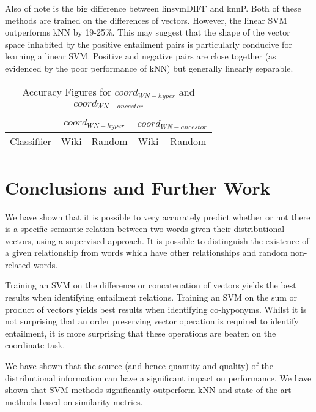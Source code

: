 \documentclass[11pt]{article}
\begin{document}
Also of note is the big difference between linsvmDIFF and knnP.  Both of these methods are trained on the differences of vectors.  However, the linear SVM outperforms kNN by 19-25\%.  This may suggest that the shape of the vector space inhabited by the positive entailment pairs is particularly conducive for learning a linear SVM.  Positive and negative pairs are close together (as evidenced by the poor performance of kNN) but generally linearly separable.

\begin{table*}[ht]
\centering
\begin{tabular}{|c|c|c|c|c|}
\hline
&\multicolumn{2}{|c|}{$coord_{WN-hyper}$}&\multicolumn{2}{|c|}{$coord_{WN-ancestor}$}\\
\hline
Classifiier&Wiki&Random&Wiki&Random\\
\hline
\hline
\end{tabular}
\caption{Accuracy Figures for $coord_{WN-hyper}$ and $coord_{WN-ancestor}$}
\label{table:results_coord_WN}
\end{table*}



\section{Conclusions and Further Work}

We have shown that it is possible to very accurately predict whether
or not there is a specific semantic relation between two words given
their distributional vectors, using a supervised approach.
It is possible to distinguish the existence of a given relationship
from words which have other relationships and random non-related
words.

Training an SVM on the difference or concatenation of vectors yields the best results when identifying entailment relations.  Training an SVM on the sum or product of vectors yields best results when identifying co-hyponyms.  Whilst it is not surprising that an order preserving vector operation is required to identify entailment, it is more surprising that these operations are beaten on the coordinate task.  

We have shown that the source (and hence quantity and quality) of the distributional information can have a significant impact on performance.  We have shown that SVM methods significantly outperform kNN and state-of-the-art methods based on similarity metrics. 











\end{document}
